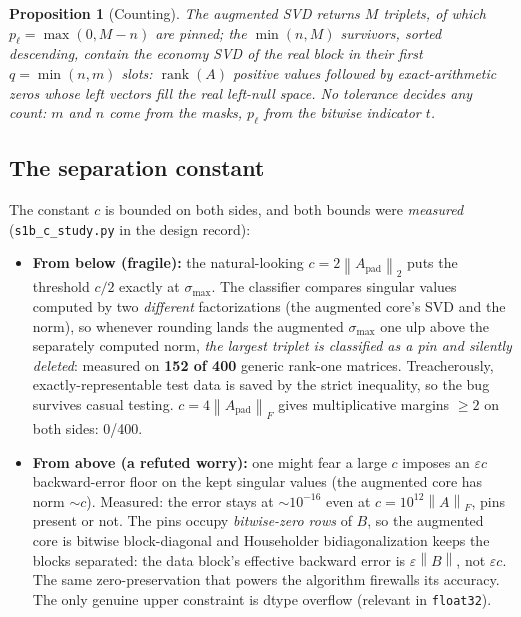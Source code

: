 \documentclass[11pt]{article}
\newtheorem{proposition}[theorem]{Proposition}
\theoremstyle{definition}
\theoremstyle{remark}
\newcommand{\Apad}{A_{\mathrm{pad}}}
\newcommand{\rank}{\operatorname{rank}}
\newcommand{\norm}[1]{\left\lVert #1 \right\rVert}
\newcommand{\code}[1]{\texttt{#1}}
\begin{document}
\begin{proposition}[Counting]\label{prop:count}
The augmented SVD returns $M$ triplets, of which $p_\ell = \max(0, M-n)$ are pinned; the
$\min(n,M)$ survivors, sorted descending, contain the economy SVD of the real block in their first
$q=\min(n,m)$ slots: $\rank(A)$ positive values followed by exact-arithmetic zeros whose left
vectors fill the real left-null space. No tolerance decides any count: $m$ and $n$ come from the
masks, $p_\ell$ from the bitwise indicator $t$.
\end{proposition}

\subsection{The separation constant}\label{sec:c}

The constant $c$ is bounded on both sides, and both bounds were \emph{measured}
(\code{s1b\_c\_study.py} in the design record):

\begin{itemize}[itemsep=2pt]
\item \textbf{From below (fragile):} the natural-looking $c = 2\norm{\Apad}_2$ puts the threshold
$c/2$ exactly at $\sigma_{\max}$. The classifier compares singular values computed by two
\emph{different} factorizations (the augmented core's SVD and the norm), so whenever rounding lands
the augmented $\sigma_{\max}$ one ulp above the separately computed norm, \emph{the largest triplet
is classified as a pin and silently deleted}: measured on \textbf{152 of 400} generic rank-one
matrices. Treacherously, exactly-representable test data is saved by the strict inequality, so the
bug survives casual testing. $c = 4\norm{\Apad}_F$ gives multiplicative margins $\ge 2$ on both
sides: 0/400.
\item \textbf{From above (a refuted worry):} one might fear a large $c$ imposes an
$\varepsilon c$ backward-error floor on the kept singular values (the augmented core has norm
$\sim c$). Measured: the error stays at $\sim 10^{-16}$ even at $c = 10^{12}\norm{A}_F$, pins
present or not. The pins occupy \emph{bitwise-zero rows} of $B$, so the augmented core is bitwise
block-diagonal and Householder bidiagonalization keeps the blocks separated: the data block's
effective backward error is $\varepsilon\norm{B}$, not $\varepsilon c$. The same zero-preservation
that powers the algorithm firewalls its accuracy. The only genuine upper constraint is dtype
overflow (relevant in \code{float32}).
\end{itemize}
\end{document}

